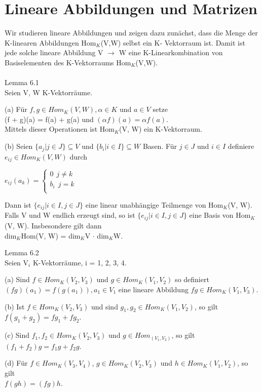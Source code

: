 \section{Lineare Abbildungen und Matrizen}
Wir studieren lineare Abbildungen und zeigen dazu zunächst, dass die Menge der K-linearen Abbildungen Hom$_K$(V,W) selbst ein K- Vektorraum ist. Damit ist jede solche lineare Abbildung V $\to$ W eine K-Linearkombination von Basiselementen des K-Vektorraums Hom$_K$(V,W).\\
\\
Lemma 6.1\\
Seien V, W K-Vektorräume.
\begin{compactenum}
\item[(a)] Für $f, g \in Hom_K(V, W), \alpha \in K$ und $a \in V$ setze\\
(f + g)(a) = f(a) + g(a) und $(\alpha f)(a) = \alpha f(a)$.\\
Mittels dieser Operationen ist Hom$_K$(V, W) ein K-Vektorraum.
\item[(b)] Seien $\{a_j | j \in J\} \subseteq V$ und $\{b_i | i \in I\} \subseteq W$ Basen. Für $j \in J$ und $i \in I$ definiere $e_{ij} \in Hom_K(V, W)$ durch
\begin{center}
$e_{ij}(a_k) =
\begin{cases}
0 ~~j \neq k\\
b_i~~ j = k\\
\end{cases}$
\end{center}
Dann ist $\{e_{ij} | i \in I, j \in J\}$ eine linear unabhängige Teilmenge von Hom$_K$(V, W). Falls V und W endlich erzeugt sind, so ist $\{e_{ij} | i \in I, j \in J\}$ eine Basis von Hom$_K$(V, W). Insbesondere  gilt dann \\dim$_K$Hom(V, W) = dim$_K$V $\cdot$ dim$_K$W.\\
\end{compactenum}
Lemma 6.2\\
Seien V$_i$ K-Vektorräume, i = 1, 2, 3, 4.
\begin{compactenum}
\item [(a)]Sind $f \in Hom_K (V_2, V_3)$ und $g \in Hom_K (V_1, V_2)$ so definiert $(fg)(a_1) = f(g(a_1)), a_1 \in V_1$
eine lineare Abbildung $fg \in Hom_K(V_1,V_3)$.
\item[(b)] Ist $f \in Hom_K (V_2, V_3)$ und sind $g_1, g_2 \in Hom_K (V_1, V_2)$, so gilt\\
$f(g_1 +g_2)=fg_1 +fg_2$.
\item[(c)] Sind $f_1, f_2 \in Hom_K (V_2, V_3)$ und $g \in Hom_ (V_1, V_2)$, so gilt\\
$(f_1 + f_2)g = f_1g + f_2g$.
\item[(d)] Für $f \in Hom_K(V_3,V_4)$, $g \in Hom_K(V_2,V_3)$ und $h \in Hom_K(V_1,V_2)$, so gilt\\
$f(gh) = (fg)h$.\\
\end{compactenum}
